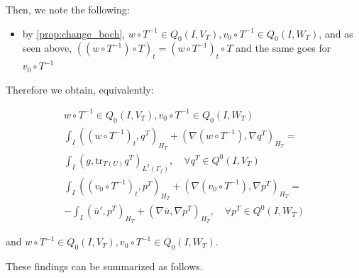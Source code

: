 \documentclass[english,a4paper,12pt,oneside]{scrbook}
\theoremstyle{break}
\theoremstyle{remark}
\newcommand{\tr}{\text{tr}}
\begin{document}
Then, we note the following:

\begin{itemize}
	\item by \cref{prop:change_boch}, $w\circ T^{-1} \in Q_0(I, V_T), v_0\circ T^{-1} \in Q_0(I,W_T) $, and as seen above, $((w\circ T^{-1})\circ T)_t = (w\circ T^{-1})_t\circ T$ and the same goes for $v_0\circ T^{-1}$
\end{itemize}

Therefore we obtain, equivalently:

\begin{align*}
w\circ T^{-1} \in Q_0(I, V_T), v_0\circ T^{-1} \in Q_0(I,W_T) \\
\int_I ((w\circ T^{-1})_t , q^T)_{H_T}+ (\nabla (w\circ T^{-1}), \nabla q^T)_{H_T} = \\\int_I(g,\tr_{T(U)} q^T)_{L^2(\Gamma_f)}, \quad \forall q^T \in Q^0(I, V_T) \\
\int_I ((v_0\circ T^{-1})_t,p^T)_{H_T} + (\nabla (v_0\circ T^{-1}), \nabla p^T)_{H_T}= \\-\int_I(\bar{u}',p^T)_{H_T}+(\nabla \bar{u}, \nabla p^T)_{H_T}, \quad \forall p^T \in Q^0(I, W_T)
\end{align*}

and $w\circ T^{-1} \in Q_0(I, V_T), v_0\circ T^{-1} \in Q_0(I,W_T)$.

These findings can be summarized as follows.
\end{document}
